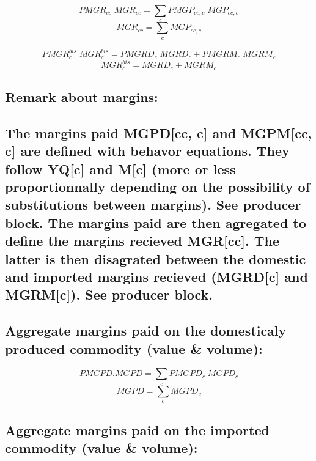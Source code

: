 \documentclass[12pt]{article}
\numberwithin{equation}{section}
\begin{document}
\begin{dmath}
PMGR_{cc} \; MGR_{cc} = \sum_{c} PMGP_{cc, c} \; MGP_{cc, c}
\end{dmath}
\begin{dmath}
MGR_{cc} = \sum_{c} MGP_{cc, c}
\end{dmath}



\begin{dmath}
PMGR^{bis}_{c} \; MGR^{bis}_{c} = PMGRD_{c} \; MGRD_{c} + PMGRM_{c} \; MGRM_{c}
\end{dmath}
\begin{dmath}
MGR^{bis}_{c} = MGRD_{c} + MGRM_{c}
\end{dmath}



\subsection{Remark about margins:}




\subsection{The margins paid MGPD[cc, c] and MGPM[cc, c] are defined with behavor equations. They follow YQ[c] and M[c] (more or less proportionnally depending on the possibility of substitutions between margins). See producer block. The margins paid are then agregated to define the margins recieved MGR[cc]. The latter is then disagrated between the domestic and imported margins recieved (MGRD[c] and MGRM[c]). See producer block.}





\subsection{Aggregate margins paid on the domesticaly produced commodity (value \& volume):}



\begin{dmath}
PMGPD . MGPD = \sum_{c} PMGPD_{c} \; MGPD_{c}
\end{dmath}
\begin{dmath}
MGPD = \sum_{c} MGPD_{c}
\end{dmath}



\subsection{Aggregate margins paid on the imported commodity (value \& volume):}
\end{document}
